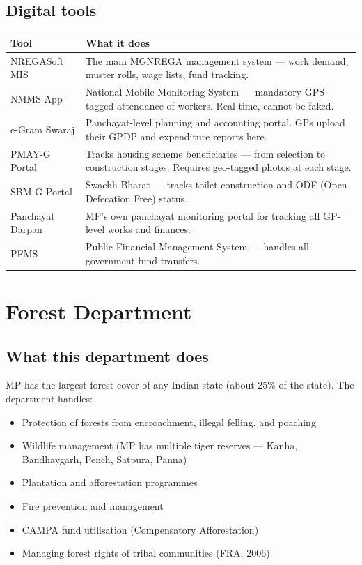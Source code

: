 \documentclass[11pt,a4paper]{article}
\begin{document}
\subsection{Digital tools}

\begin{tabularx}{\textwidth}{@{}L{3.5cm} X@{}}
\toprule
\textbf{Tool} & \textbf{What it does} \\
\midrule
NREGASoft MIS & The main MGNREGA management system --- work demand, muster rolls, wage lists, fund tracking. \\
NMMS App & National Mobile Monitoring System --- mandatory GPS-tagged attendance of workers. Real-time, cannot be faked. \\
e-Gram Swaraj & Panchayat-level planning and accounting portal. GPs upload their GPDP and expenditure reports here. \\
PMAY-G Portal & Tracks housing scheme beneficiaries --- from selection to construction stages. Requires geo-tagged photos at each stage. \\
SBM-G Portal & Swachh Bharat --- tracks toilet construction and ODF (Open Defecation Free) status. \\
Panchayat Darpan & MP's own panchayat monitoring portal for tracking all GP-level works and finances. \\
PFMS & Public Financial Management System --- handles all government fund transfers. \\
\bottomrule
\end{tabularx}

\newpage
\section{Forest Department}

\subsection{What this department does}

MP has the largest forest cover of any Indian state (about 25\% of the state). The department handles:
\begin{itemize}[nosep]
  \item Protection of forests from encroachment, illegal felling, and poaching
  \item Wildlife management (MP has multiple tiger reserves --- Kanha, Bandhavgarh, Pench, Satpura, Panna)
  \item Plantation and afforestation programmes
  \item Fire prevention and management
  \item CAMPA fund utilisation (Compensatory Afforestation)
  \item Managing forest rights of tribal communities (FRA, 2006)
\end{itemize}
\end{document}
